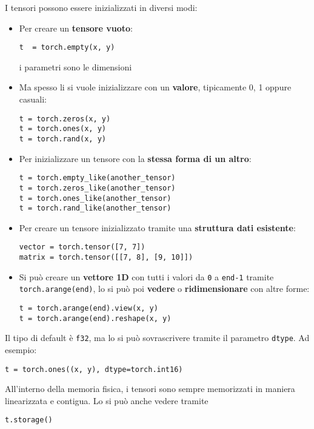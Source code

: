 I tensori possono essere inizializzati in diversi modi: 
\begin{itemize}
    \item Per creare un \textbf{tensore vuoto}:
    \begin{verbatim}
t  = torch.empty(x, y)
    \end{verbatim}
    i parametri sono le dimensioni
    
    \item Ma spesso li si vuole inizializzare con un \textbf{valore}, tipicamente 0, 1 oppure casuali:
    \begin{verbatim}
t = torch.zeros(x, y)
t = torch.ones(x, y)
t = torch.rand(x, y)
    \end{verbatim}
    
    \item Per inizializzare un tensore con la \textbf{stessa forma di un altro}:
    \begin{verbatim}
t = torch.empty_like(another_tensor)
t = torch.zeros_like(another_tensor)
t = torch.ones_like(another_tensor)
t = torch.rand_like(another_tensor)
    \end{verbatim}
    
    \item Per creare un tensore inizializzato tramite una \textbf{struttura dati esistente}:
    \begin{verbatim}
vector = torch.tensor([7, 7])
matrix = torch.tensor([[7, 8], [9, 10]])
    \end{verbatim}
    
    \item Si può creare un \textbf{vettore 1D} con tutti i valori da \texttt{0} a \texttt{end-1} tramite \texttt{torch.arange(end)}, lo si può poi \textbf{vedere} o \textbf{ridimensionare} con altre forme:
    \begin{verbatim}
t = torch.arange(end).view(x, y)
t = torch.arange(end).reshape(x, y)
    \end{verbatim}
\end{itemize}

Il tipo di default è \texttt{f32}, ma lo si può sovrascrivere tramite il parametro \texttt{dtype}. Ad esempio:
\begin{verbatim}
t = torch.ones((x, y), dtype=torch.int16)
\end{verbatim}

All'interno della memoria fisica, i tensori sono sempre memorizzati in maniera linearizzata e contigua. Lo si può anche vedere tramite
\begin{verbatim}
t.storage()
\end{verbatim}

